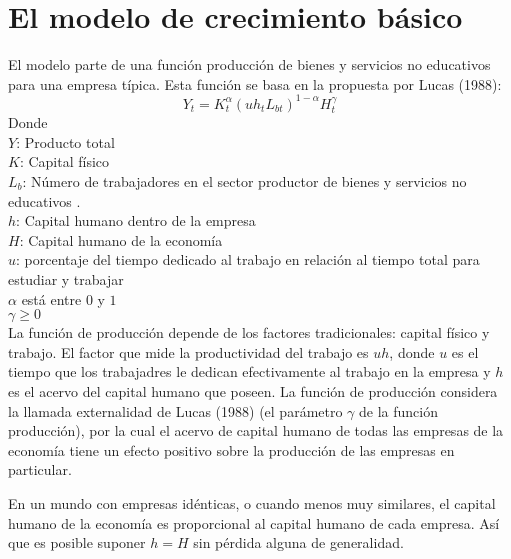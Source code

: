 \documentclass[12pt,notitlepage]{report}
\begin{document}
	\chapter{El modelo de crecimiento básico}
	El modelo parte de una función producción de bienes y servicios no educativos para una empresa típica. Esta función se basa en la propuesta por Lucas (1988):
	\begin{equation}\label{ecu1}
		Y_t=K_t^\alpha(uh_tL_{bt})^{1-\alpha}H_t^\gamma
	\end{equation}
	Donde  \\
	\hspace*{0.7cm}$Y$: Producto total\\
	\hspace*{0.7cm}$K$: Capital físico\\
	\hspace*{0.7cm}$L_b$: Número de trabajadores en el sector productor de bienes y servicios no educativos .\\
	\hspace*{0.7cm}$h$: Capital humano dentro de la empresa\\ 
	\hspace*{0.7cm}$H$: Capital humano de la economía\\
	\hspace*{0.7cm}$u$: porcentaje del tiempo dedicado al trabajo en relación al tiempo total para estudiar y trabajar\\ 
	\hspace*{0.7cm}$\alpha$ está entre $0$ y $1$\\
	\hspace*{0.7cm}$\gamma\geq 0$ \\
	La función de producción depende de los factores tradicionales: capital físico y trabajo. El factor que mide la productividad del trabajo es $uh$, donde $u$ es el tiempo que los trabajadres le dedican efectivamente al trabajo en la empresa y $h$ es el acervo del capital humano que poseen. La función de producción considera la llamada externalidad de Lucas (1988) (el parámetro $\gamma$ de la función producción), por la cual el acervo de capital humano de todas las empresas de la economía tiene un efecto positivo sobre la producción de las empresas en particular.
	
	En un mundo con empresas idénticas, o cuando menos muy similares, el capital humano de la economía es proporcional al capital humano de cada empresa. Así que es posible suponer $h=H$ sin pérdida alguna de generalidad.
	
\end{document}

